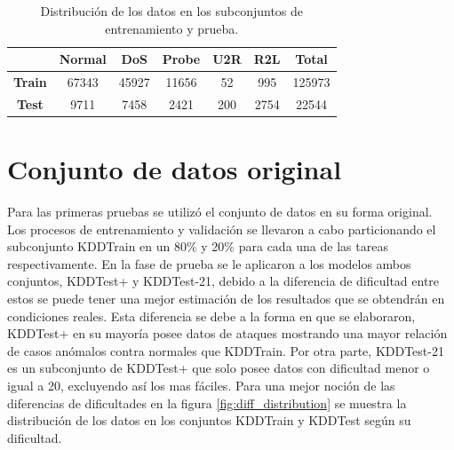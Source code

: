 \begin{table}[h!t]
    \begin{center}
        \label{tab:atk_counts}
        \begin{tabular}{c|c|c|c|c|c|c} %
        \textbf{} & \textbf{Normal} & \textbf{DoS} & \textbf{Probe} & \textbf{U2R} & \textbf{R2L} & \textbf{Total}\\
        \hline
        \textbf{Train} & 67343 & 45927 & 11656 & 52 & 995 & 125973\\
        \textbf{Test} & 9711 & 7458 & 2421 & 200 & 2754 & 22544\\
        \end{tabular}

        \caption{Distribución de los datos en los subconjuntos de entrenamiento y prueba.}
    \end{center}
\end{table}

\section{Conjunto de datos original}
Para las primeras pruebas se utilizó el conjunto de datos en su forma original. Los procesos de entrenamiento y validación se llevaron a cabo particionando el subconjunto KDDTrain en un 80\% y 20\% para cada una de las tareas respectivamente. En la fase de prueba se le aplicaron a los modelos ambos conjuntos, KDDTest+ y KDDTest-21, debido a la diferencia de dificultad entre estos se puede tener una mejor estimación de los resultados que se obtendrán en condiciones reales. Esta diferencia se debe a la forma en que se elaboraron, KDDTest+ en su mayoría posee datos de ataques mostrando una mayor relación de casos anómalos contra normales que KDDTrain. Por otra parte, KDDTest-21 es un subconjunto de KDDTest+ que solo posee datos con dificultad menor o igual a 20, excluyendo así los mas fáciles. Para una mejor noción de las diferencias de dificultades en la figura \ref{fig:diff_distribution} se muestra la distribución de los datos en los conjuntos KDDTrain y KDDTest según su dificultad.

